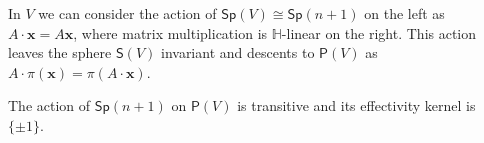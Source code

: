 \documentclass[12pt, a4paper]{amsart}
\renewcommand{\H}{\mathbb{H}}
\theoremstyle{remark}
\begin{document}
In $V$ we can consider the action of $\mathsf{Sp}(V)\cong\mathsf{Sp}(n+1)$ on the left as
$A\cdot\mathbf{x}=A\mathbf{x}$, where matrix multiplication is $\H$-linear on the right.
This action leaves the sphere $\mathsf{S}(V)$ invariant and descents to $\mathsf{P}(V)$ as $A\cdot\pi(\mathbf{x})=\pi(A\cdot\mathbf{x})$.

The action of $\mathsf{Sp}(n+1)$ on $\mathsf{P}(V)$ is transitive and its effectivity kernel is $\{\pm 1\}$.

\end{document}

